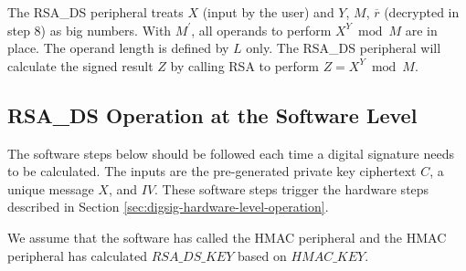 \documentclass[main\_\_EN.tex]{subfiles}
\begin{document}
\begin{enumerate}
        The RSA\_DS peripheral treats \begin{math}X\end{math} (input by the user) and \begin{math}Y\end{math}, \begin{math}M\end{math}, \begin{math}\overline{r}\end{math} (decrypted in step 8) as big numbers. With \begin{math}M^{\prime}\end{math}, all operands to perform \begin{math} X^{Y} \bmod M\end{math} are in place. The operand length is defined by \begin{math}L\end{math} only. The RSA\_DS peripheral will calculate the signed result \begin{math}Z\end{math} by calling RSA to perform \begin{math}Z = X^{Y} \bmod M\end{math}.

\end{enumerate}

\subsection{RSA\_DS Operation at the Software Level}

The software steps below should be followed each time a digital signature needs to be calculated. The inputs are the pre-generated private key ciphertext \begin{math}C\end{math}, a unique message \begin{math}X\end{math}, and \begin{math}IV\end{math}. These software steps trigger the hardware steps described in Section \ref{sec:digsig-hardware-level-operation}.

We assume that the software has called the HMAC peripheral and the HMAC peripheral has calculated \begin{math}RSA\_DS\_KEY\end{math} based on \begin{math}HMAC\_KEY\end{math}.
\end{document}
